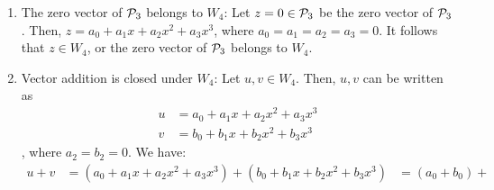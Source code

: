 \begin{sol}
\begin{enumerate}[(i)]
    \begin{enumerate}[(1)]
        \item The zero vector of $\P_3$ belongs to $W_4$: Let $z=0\in\P_3$ be the zero vector of $\P_3$. Then, $z=a_0+a_1x+a_2x^{2}+a_3x^{3}$, where $a_0=a_1=a_2=a_3=0$. It follows that $z\in W_4$, or the zero vector of $\P_3$ belongs to $W_4$.
        \item Vector addition is closed under $W_4$: Let $u,v\in W_4$. Then, $u, v$ can be written as
        \[
            \begin{aligned}
                u &= a_0+a_1x+a_2x^{2}+a_3x^{3}\\
                v &= b_0+b_1x+b_2x^{2}+b_3x^{3}
            \end{aligned}
        \]
        , where $a_2=b_2=0$. We have:
        \[
            \begin{aligned}
                u+v &= (a_0+a_1x+a_2x^{2}+a_3x^{3})+(b_0+b_1x+b_2x^{2}+b_3x^{3})
                    &= (a_0+b_0)+
            \end{aligned}
        \]
    \end{enumerate}
\end{enumerate}
\end{sol}